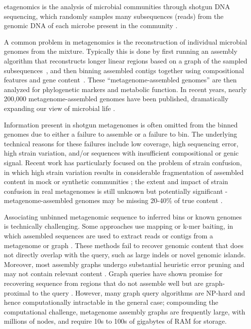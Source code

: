etagenomics is the analysis of microbial communities through shotgun
DNA sequencing, which randomly samples many subsequences (reads)
from the genomic DNA of each microbe present in the community \cite{Quince2017}.

A common problem in metagenomics is the reconstruction of
individual microbial genomes from the mixture.
Typically this is
done by first running an assembly algorithm that reconstructs
longer linear regions based on a graph of the sampled
subsequences~\cite{pell2012scaling}, and then binning assembled
contigs together using compositional features and gene content~\cite{laczny2017busybee,lin2016accurate}.  These
``metagenome-assembled genomes'' are then
analyzed for phylogenetic markers and metabolic function. In recent years,
nearly 200,000 metagenome-assembled genomes have been published,
dramatically expanding our view of microbial life
\cite{Parks2017,Tully2018,Stewart2018,Delmont2018,Hug2016,Pasolli2019}.

Information present in shotgun metagenomes is often omitted from the
binned genomes due to either a failure to
assemble \cite{CAMI,Awad155358} or a failure to bin.  The underlying
technical reasons for these failures include low coverage, high
sequencing error, high strain variation, and/or sequences with
insufficient compositional or genic signal.  Recent work has
particularly focused on the problem of strain confusion, in which high
strain variation results in considerable fragmentation of assembled
content in mock or synthetic communities \cite{CAMI,Awad155358}; the
extent and impact of strain confusion in real metagenomes is still
unknown but potentially significant - metagenome-assembled genomes may be missing 20-40\% of true content \cite{brownstrain,Brito2016,baltic}.

Associating unbinned metagenomic sequence to inferred bins or known
genomes is technically challenging.  Some approaches use mapping or
k-mer baiting, in which assembled sequences are used to extract reads
or contigs from a metagenome or
graph \cite{desman,Nayfach2016,ekg,mspminer,Petersen2016}.
These
methods fail to recover genomic content that does not directly overlap
with the query, such as large indels or novel genomic
islands. Moreover, most assembly graphs undergo substantial heuristic
error pruning and may not contain relevant content
\cite{CAMI,Awad155358}.
Graph queries have shown promise for recovering sequence from regions that do
not assemble well but are graph-proximal to the query \cite{metacherchant,perchlorate}. However, many graph query
algorithms are NP-hard and hence computationally intractable in the
general case; compounding the computational challenge, metagenome assembly
graphs are frequently large, with millions of nodes, and require 10s
to 100s of gigabytes of RAM for storage.

